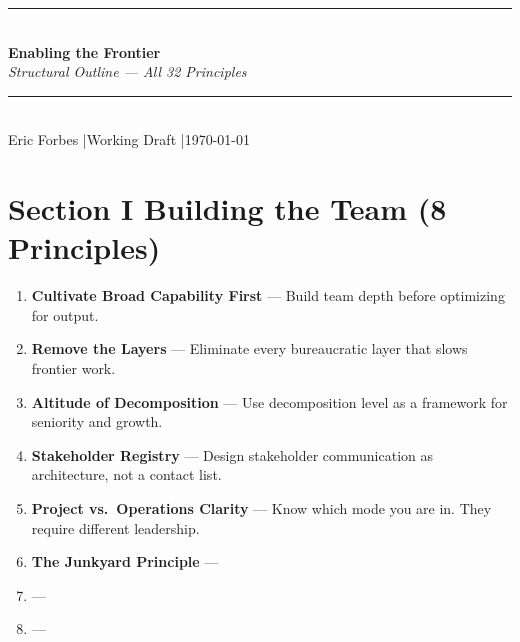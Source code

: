 \documentclass[11pt, letterpaper]{article}
\begin{document}
\begin{center}
  {\color{principleblue}\rule{\linewidth}{1.5pt}}\\[0.5em]
  {\LARGE\bfseries\color{principleblue} Enabling the Frontier}\\[0.3em]
  {\large\itshape\color{midgray} Structural Outline --- All 32 Principles}\\[0.3em]
  {\color{principleblue}\rule{\linewidth}{0.5pt}}\\[0.3em]
  {\small\color{midgray} Eric Forbes \quad|\quad Working Draft \quad|\quad \today}
\end{center}

\vspace{1.5em}

\section*{\color{principleblue} Section I \quad Building the Team \quad \normalfont\small\color{midgray}(8 Principles)}
\vspace{0.5em}

\begin{enumerate}[leftmargin=2em, label=\textbf{I.\arabic*.}]
  \item \textbf{Cultivate Broad Capability First} ---
        Build team depth before optimizing for output.
  \item \textbf{Remove the Layers} ---
        Eliminate every bureaucratic layer that slows frontier work.
  \item \textbf{Altitude of Decomposition} ---
        Use decomposition level as a framework for seniority and growth.
  \item \textbf{Stakeholder Registry} ---
        Design stakeholder communication as architecture, not a contact list.
  \item \textbf{Project vs.\ Operations Clarity} ---
        Know which mode you are in. They require different leadership.
  \item \textbf{The Junkyard Principle} ---
  \item \textbf{\tbd[Principle 7]} ---
  \item \textbf{\tbd[Principle 8]} ---
\end{enumerate}

\vspace{1em}
\end{document}
